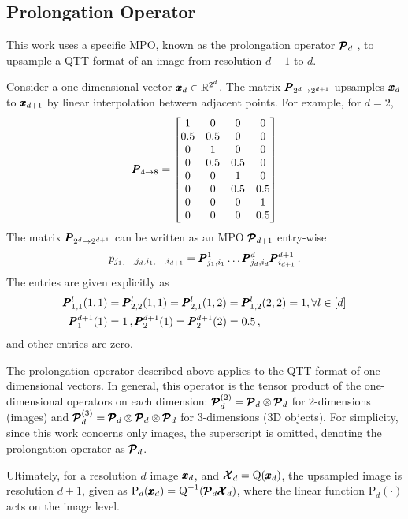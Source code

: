 \subsection{Prolongation Operator}\label{app:TN.P}
This work uses a specific MPO, known as the
prolongation operator $\pmb{\mathcal{P}}_d$ \cite{lubasch2018multigrid}, to upsample a QTT format
of an image from resolution $d-1$ to $d$.

Consider a one-dimensional vector $\pmb{x}_d \in \mathbb{R}^{2^d}$.
The matrix $\pmb{P}_{2^d \to 2^{d+1}}$ upsamples $\pmb{x}_d$ to $\pmb{x}_{d+1}$ by linear interpolation between adjacent points.
For example, for $d=2$,
\[
\pmb{P}_{4 \to 8} =
\begin{bmatrix}
1 & 0 & 0 & 0 \\
0.5 & 0.5 & 0 & 0 \\
0 & 1 & 0 & 0 \\
0 & 0.5 & 0.5 & 0 \\
0 & 0 & 1 & 0 \\
0 & 0 & 0.5 & 0.5 \\
0 & 0 & 0 & 1 \\
0 & 0 & 0 & 0.5
\end{bmatrix}
\]
The matrix $\pmb{P}_{2^d \to 2^{d+1}}$ can be written
as an MPO $\pmb{\mathcal{P}}_{d+1}$ entry-wise
\[
p_{j_1,\ldots, j_d, i_1, \ldots, i_{d+1}} = \pmb{P}^1_{j_1,i_1} \ldots \pmb{P}^{d}_{j_d,i_d} \pmb{P}^{d+1}_{i_{d+1}} \,.
\]
The entries are given explicitly \cite{lubasch2018multigrid} as
\begin{align}
    \pmb{P}^l_{1,1}(1,1) &= \pmb{P}^l_{2,2}(1,1) = \pmb{P}^l_{2,1}(1,2) = \pmb{P}^l_{1,2}(2,2) = 1, \forall l \in [d] \notag \\
    \pmb{P}^{d+1}_{1}(1) &= 1 \,, \pmb{P}^{d+1}_{2}(1) = \pmb{P}^{d+1}_{2}(2) = 0.5 \notag \,,
\end{align}
and other entries are zero.

The prolongation operator described above applies to the QTT format of
one-dimensional vectors. In general, this operator is the tensor product of the one-dimensional operators on each dimension: $\pmb{\mathcal{P}}_d^{(2)}=\pmb{\mathcal{P}}_d \otimes \pmb{\mathcal{P}}_d$ for 2-dimensions (images)
and $\pmb{\mathcal{P}}_d^{(3)}=\pmb{\mathcal{P}}_d \otimes \pmb{\mathcal{P}}_d \otimes \pmb{\mathcal{P}}_d$ for 3-dimensions (3D objects).
For simplicity, since this work concerns only images,
the superscript is omitted, denoting
the prolongation operator as $\pmb{\mathcal{P}}_d$.

Ultimately, for a resolution $d$ image $\pmb{x}_d$, and
$\pmb{\mathcal{X}}_d = \operatorname{Q}(\pmb{x}_d)$,
the upsampled image is resolution $d+1$, given as $\text{P}_d(\pmb{x}_{d}) = \operatorname{Q}^{-1}(\pmb{\mathcal{P}}_d\pmb{\mathcal{X}}_d)$,
where the linear function $\text{P}_d(\cdot)$ acts on the image level.

